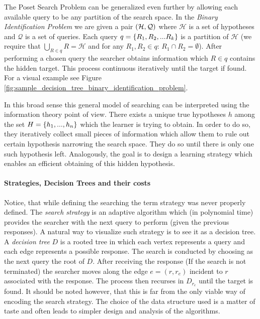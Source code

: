 

The Poset Search Problem can be generalized even further by allowing each available query to be any partition of the search space. In the \textit{Binary Identification Problem} we are given a pair $\mathopen{}\left( \mathcal{H}, \mathcal{Q} \right)$ where $\mathcal{H}$ is a set of hypotheses and $\mathcal{Q}$ is a set of queries. Each query $q = \mathopen{}\left\{ R_1, R_2,...R_k \right\}$ is a partition of $\mathcal{H}$ (we require that $\bigcup_{R\in q}R=\mathcal{H}$ and for any $R_1,R_2\in q$: $R_1\cap R_2=\emptyset$). After performing a chosen query the searcher obtains information which $R\in q$ contains the hidden target. This process continuous iteratively until the target if found. For a visual example see Figure \ref{fig:sample_decision_tree_binary_identification_problem}. 

In this broad sense this general model of searching can be interpreted using the information theory point of view. There exists a unique true hypotheses $h$ among the set $H=\mathopen{}\left\{ h_1,...,h_n \right\}$ which the learner is trying to obtain. In order to do so, they iteratively collect small pieces of information which allow them to rule out certain hypothesis narrowing the search space. They do so until there is only one such hypothesis left. Analogously, the goal is to design a learning strategy which enables an efficient obtaining of this hidden hypothesis. 



\paragraph{Strategies, Decision Trees and their costs}
Notice, that while defining the searching the term strategy was never properly defined. The \textit{search strategy} is an adaptive algorithm which (in polynomial time) provides the searcher with the next query to perform (given the previous responses). A natural way to visualize such strategy is to see it as a decision tree. A \textit{decision tree} $D$ is a rooted tree in which each vertex represents a query and each edge represents a possible response. The search is conducted by choosing as the next query the root of $D$. After receiving the response (If the search is not terminated) the searcher moves along the edge $e=(r, r_e)$ incident to $r$ associated with the response. The process then recurses in $D_{r_e}$ until the target is found. It should be noted however, that this is far from the only viable way of encoding the search strategy. The choice of the data structure used is a matter of taste and often leads to simpler design and analysis of the algorithms.

